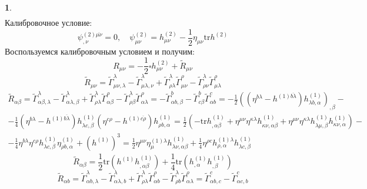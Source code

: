 \documentclass[12pt]{article}
\theoremstyle{definition}
\newtheorem{zad}{}[section]
\begin{document}
\begin{zad}
\begin{multline}
\end{multline}
Калибровочное условие:
\begin{equation}
    \psi^{(2)\overline{\mu\nu}}_{,\nu}=0,\quad \psi_{\mu\nu}^{(2)}=h^{(2)}_{\mu\nu}-\frac{1}{2}\eta_{\mu\nu}\text{tr}h^{(2)}
\end{equation}
Воспользуемся калибровочным условием и получим:
\begin{equation}
    \boxed{R_{\mu\nu}=-\frac{1}{2}\square h^{(2)}_{\mu\nu}+\tilde R_{\mu\nu}}
\end{equation}
\begin{equation}
    \tilde R_{\mu\nu}=\tilde\Gamma^\lambda_{\mu\nu,\lambda}-\tilde\Gamma^\lambda_{\mu\lambda,\nu}+\tilde\Gamma^\lambda_{\rho\lambda}\tilde\Gamma^\rho_{\mu\nu}-\tilde\Gamma^\lambda_{\rho\nu}\tilde\Gamma^\rho_{\mu\lambda}
\end{equation}
\begin{multline}
    \tilde R_{\alpha\beta}=\tilde\Gamma^\lambda_{\alpha\beta,\lambda}-\tilde\Gamma^\lambda_{\alpha\lambda,\beta}+\tilde\Gamma^\lambda_{\rho\lambda}\tilde\Gamma^\rho_{\alpha\beta}-\tilde\Gamma^\lambda_{\rho\beta}\tilde\Gamma^\rho_{\alpha\lambda}=-\tilde\Gamma^b_{\alpha b,\beta}-\tilde\Gamma^b_{c\beta}\tilde\Gamma^c_{\alpha b}=-\frac{1}{2}((\eta^{b\lambda}-h^{(1)\overline{b\lambda}})h^{(1)}_{\lambda b,\alpha})_{,\beta}-\\-\frac{1}{4}(\eta^{b\lambda}-h^{(1)\overline{b\lambda}})h^{(1)}_{\lambda c,\beta}(\eta^{c\rho}-h^{(1)\overline{c\rho}})h^{(1)}_{\rho b,\alpha}=\frac{1}{2}(-\text{tr}h^{(1)}_{,\alpha\beta}+\eta^{\mu\nu}\eta^{\kappa\lambda}h^{(1)}_{\kappa\nu,\alpha\beta}+\eta^{\mu\nu}\eta^{\kappa\lambda}h^{(1)}_{\lambda\mu,\beta}h^{(1)}_{\kappa\nu,\alpha})-\\-\frac{1}{4}\eta^{b\lambda}\eta^{c\rho}h^{(1)}_{\lambda c,\beta}\eta^{(1)}_{\rho b,\alpha}+(h^{(1)})^3=\frac{1}{2}\eta^{\mu\nu}\eta^{(1)\lambda}_\mu h^{(1)}_{\lambda\nu,\alpha\beta}+\frac{1}{4}\eta^{\rho c}h^{(1)\lambda}_{\rho,\alpha}h^{(1)}_{\lambda c,\beta}
\end{multline}
\begin{equation}
    \boxed{\tilde R_{\alpha\beta}=\frac{1}{2}\text{tr}(h^{(1)}h^{(1)}_{,\alpha\beta})+\frac{1}{4}\text{tr}(h^{(1)}_{,\alpha}h^{(1)}_{,\beta})}
\end{equation}
\begin{equation}
    \tilde R_{\alpha b}=\tilde\Gamma^\lambda_{\alpha b,\lambda}-\tilde\Gamma^\lambda_{\alpha\lambda,b}+\tilde\Gamma^\lambda_{\rho\lambda}\tilde\Gamma^\rho_{\alpha b}-\tilde\Gamma^\lambda_{\rho b}\tilde\Gamma^\rho_{\alpha\lambda}=\tilde\Gamma^c_{\alpha b,c}-\tilde\Gamma^c_{\alpha c,b}

\end{equation}
\end{zad}
\end{document}
